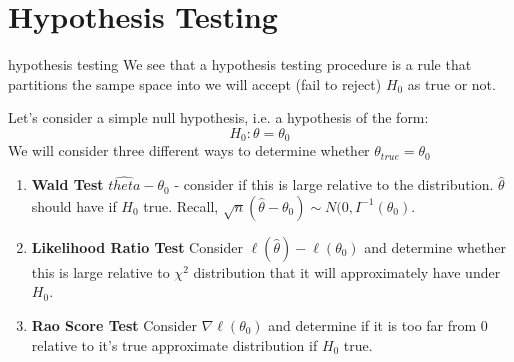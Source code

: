 \documentclass[11pt,fleqn]{book} %
\begin{document}
\chapter{Hypothesis Testing}

\begin{definition}{hypothesis testing}
	We see that a hypothesis testing procedure is a rule that partitions the sampe space into we will accept (fail to reject) $H_0$ as true or not.
\end{definition}

Let's consider a simple null hypothesis, i.e. a hypothesis of the form:
$$H_0: \theta=\theta_0 $$
We will consider three different ways to determine whether $\theta_{true} = \theta_0$

\begin{enumerate}
	\item \textbf{Wald Test} $\hat{theta} - \theta_0$ - consider if this is large relative to the distribution. $\hat{\theta}$ should have if $H_0$ true. Recall, $\sqrt{n}(\hat{\theta}-\theta_0)\sim N(0,I^{-1}(\theta_0)$.
	\item \textbf{Likelihood Ratio Test} Consider $\ell(\hat{\theta}) - \ell(\theta_0)$ and determine whether this is large relative to $\chi^2$ distribution that it will approximately have under $H_0$. 
	\item \textbf{Rao Score Test} Consider $\nabla\ell(\theta_0)$ and determine if it is too far from 0 relative to it's true approximate distribution if $H_0$ true.  
\end{enumerate}


\end{document}

